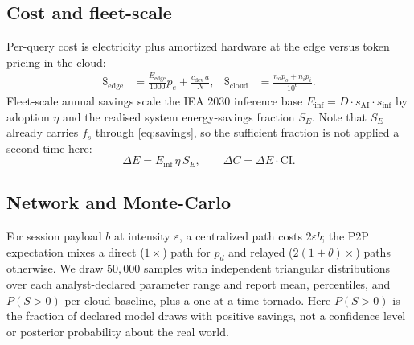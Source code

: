 \documentclass[conference]{IEEEtran}
\newcommand{\fs}{f_{s}}
\begin{document}
\subsection{Cost and fleet-scale}
Per-query cost is electricity plus amortized hardware at the edge versus token
pricing in the cloud:
\begin{align}
\$_{\text{edge}}&=\tfrac{E_{\text{edge}}}{1000}p_{e}+\tfrac{c_{\text{dev}}\,a}{N},&
\$_{\text{cloud}}&=\tfrac{n_o p_{o}+n_i p_{i}}{10^6}.
\end{align}
Fleet-scale annual savings scale the IEA 2030 inference base
$E_{\text{inf}}=D\cdot s_{\text{AI}}\cdot s_{\text{inf}}$ by adoption $\eta$ and
the realised system energy-savings fraction $S_E$. Note that $S_E$ already
carries $\fs$ through \eqref{eq:savings}, so the sufficient fraction is not
applied a second time here:
\begin{equation}
\Delta E = E_{\text{inf}}\,\eta\,S_E,\qquad
\Delta C = \Delta E\cdot \mathrm{CI}.
\end{equation}

\subsection{Network and Monte-Carlo}
For session payload $b$ at intensity $\varepsilon$, a centralized path costs
$2\varepsilon b$; the P2P expectation mixes a direct ($1\times$) path for $p_d$
and relayed ($2(1{+}\theta)\times$) paths otherwise. We draw $50{,}000$ samples
with independent triangular distributions over each analyst-declared parameter
range and report mean, percentiles, and $P(S>0)$ per cloud baseline, plus a
one-at-a-time tornado. Here $P(S>0)$ is the fraction of declared model draws
with positive savings, not a confidence level or posterior probability about
the real world.
\end{document}
